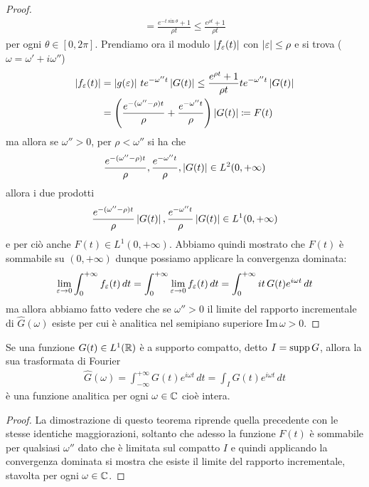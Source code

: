 \begin{proof}
\begin{align}
    = \frac{e^{-t \sin \theta}+ 1}{\rho t} \leq \frac{e^{\rho t}+ 1}{\rho t}
  \end{align}
  per ogni $ \theta \in [0,2\pi] $. Prendiamo ora il modulo $ \left|{f_\varepsilon(t)}\right| $ con $ \left|{\varepsilon}\right| \leq \rho $ e si trova ($ \omega = \omega' + i \omega'' $)
  \begin{align}
    \left|{f_\varepsilon(t)}\right| &= \left|{g(\varepsilon)}\right| \, t e^{-\omega'' t} \left|{G(t)}\right| \leq \frac{e^{\rho t}+ 1}{\rho t} t e^{-\omega'' t} \left|{G(t)}\right|
    \\
    &= \left( \frac{e^{-(\omega''- \rho)t}}\rho  + \frac{e^{-\omega'' t}}\rho  \right) \left|{G(t)}\right| \coloneq F(t)
  \end{align}
  ma allora se $ \omega'' > 0 $, per $ \rho < \omega '' $ si ha che 
  \begin{align}
    \frac{e^{-(\omega''- \rho)t}}\rho, \frac{e^{-\omega'' t}}\rho, \left|{G(t)}\right| \in L^2(0, +\infty)
  \end{align} 
  allora i due prodotti 
  \begin{align}
    \frac{e^{-(\omega''- \rho)t}}\rho \left|{G(t)}\right|, \frac{e^{-\omega'' t}}\rho \left|{G(t)}\right| \in L^1(0, +\infty)
  \end{align}
  e per ciò anche $ F(t) \in L^1(0, +\infty) $. Abbiamo quindi mostrato che $ F(t) $ è sommabile su $ (0,+\infty) $ dunque possiamo applicare la 
  convergenza dominata:
  \begin{align}
    \lim_{\varepsilon \to 0}\int_0^{+\infty} f_\varepsilon(t) \, dt = \int_0^{+\infty} \lim_{\varepsilon \to 0} f_\varepsilon(t) \, dt 
    = \int_0^{+\infty} i t\, G(t) e^{i\omega t} \, dt
  \end{align}
  ma allora abbiamo fatto vedere che se $ \omega'' > 0 $ il limite del rapporto incrementale di $ \hat{G}(\omega) $ esiste per cui è analitica nel 
  semipiano superiore $ \text{Im}\,\omega > 0 $.
\end{proof}

\begin{theorem}[  ]
  Se una funzione $ G(t) \in L^1(\mathbb{R}) $ è a supporto compatto, detto $ I = \operatorname{\textnormal{supp}} G $, allora la sua trasformata di Fourier
  \begin{align}
    \hat{G}(\omega) = \int_{-\infty}^{+\infty} G(t) e^{i\omega t}\,dt = \int_I G(t)e^{i\omega t} \, dt
  \end{align} 
  è una funzione analitica per ogni $ \omega \in \mathbb{C} $ cioè intera.
\end{theorem}
\begin{proof}
  La dimostrazione di questo teorema riprende quella precedente con le stesse identiche maggiorazioni, soltanto che adesso la funzione $ F(t) $ è 
  sommabile per qualsiasi $ \omega'' $ dato che è limitata sul compatto $ I $ e quindi applicando la convergenza dominata si mostra che esiste il limite 
  del rapporto incrementale, stavolta per ogni $ \omega \in \mathbb{C} $.
\end{proof}

